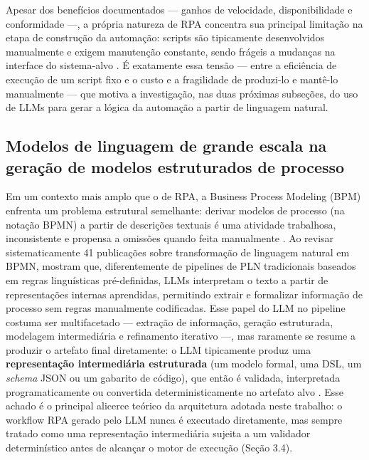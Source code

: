 \documentclass[
	article,
	12pt,
	oneside,
	a4paper,
	section=TITLE,
	english,
	brazil,
	sumario=tradicional
	]{abntex2}
\begin{document}
Apesar dos benefícios documentados --- ganhos de velocidade,
disponibilidade e conformidade \cite{wewerka2020} ---, a própria natureza
de RPA concentra sua principal limitação na etapa de construção da
automação: scripts são tipicamente desenvolvidos manualmente e exigem
manutenção constante, sendo frágeis a mudanças na interface do sistema-alvo
\cite{chen2026}. É exatamente essa tensão --- entre a eficiência de
execução de um script fixo e o custo e a fragilidade de produzi-lo e
mantê-lo manualmente --- que motiva a investigação, nas duas próximas
subseções, do uso de LLMs para gerar a lógica da automação a partir de
linguagem natural.

\subsection{Modelos de linguagem de grande escala na geração de modelos estruturados de processo}

Em um contexto mais amplo que o de RPA, a Business Process Modeling (BPM)
enfrenta um problema estrutural semelhante: derivar modelos de processo
(na notação BPMN) a partir de descrições textuais é uma atividade
trabalhosa, inconsistente e propensa a omissões quando feita manualmente
\cite{bettencourt2026}. Ao revisar sistematicamente 41 publicações sobre
transformação de linguagem natural em BPMN, 
mostram que, diferentemente de pipelines de PLN tradicionais baseados em
regras linguísticas pré-definidas, LLMs interpretam o texto a partir de
representações internas aprendidas, permitindo extrair e formalizar
informação de processo sem regras manualmente codificadas. Esse papel do
LLM no pipeline costuma ser multifacetado --- extração de informação,
geração estruturada, modelagem intermediária e refinamento iterativo ---,
mas raramente se resume a produzir o artefato final diretamente: o LLM
tipicamente produz uma \textbf{representação intermediária estruturada}
(um modelo formal, uma DSL, um \textit{schema} JSON ou um gabarito de
código), que então é validada, interpretada programaticamente ou
convertida deterministicamente no artefato alvo \cite{bettencourt2026}.
Esse achado é o principal alicerce teórico da arquitetura adotada neste
trabalho: o workflow RPA gerado pelo LLM nunca é executado diretamente,
mas sempre tratado como uma representação intermediária sujeita a um
validador determinístico antes de alcançar o motor de execução (Seção
3.4).
\end{document}
